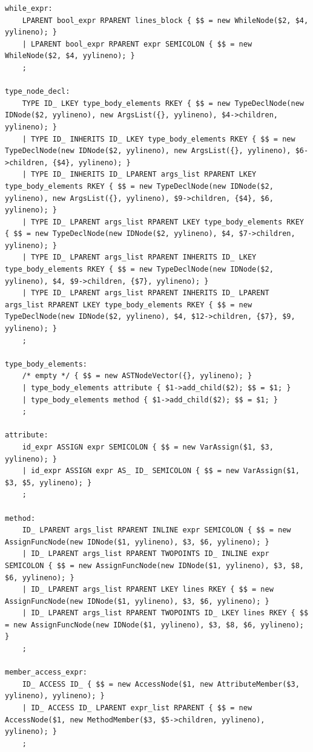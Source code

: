 \documentclass{article}
\begin{document}
\begin{verbatim}
while_expr:
	LPARENT bool_expr RPARENT lines_block { $$ = new WhileNode($2, $4, yylineno); }
	| LPARENT bool_expr RPARENT expr SEMICOLON { $$ = new WhileNode($2, $4, yylineno); }
	;

type_node_decl:
	TYPE ID_ LKEY type_body_elements RKEY { $$ = new TypeDeclNode(new IDNode($2, yylineno), new ArgsList({}, yylineno), $4->children, yylineno); }
	| TYPE ID_ INHERITS ID_ LKEY type_body_elements RKEY { $$ = new TypeDeclNode(new IDNode($2, yylineno), new ArgsList({}, yylineno), $6->children, {$4}, yylineno); }
	| TYPE ID_ INHERITS ID_ LPARENT args_list RPARENT LKEY type_body_elements RKEY { $$ = new TypeDeclNode(new IDNode($2, yylineno), new ArgsList({}, yylineno), $9->children, {$4}, $6, yylineno); }
	| TYPE ID_ LPARENT args_list RPARENT LKEY type_body_elements RKEY { $$ = new TypeDeclNode(new IDNode($2, yylineno), $4, $7->children, yylineno); }
	| TYPE ID_ LPARENT args_list RPARENT INHERITS ID_ LKEY type_body_elements RKEY { $$ = new TypeDeclNode(new IDNode($2, yylineno), $4, $9->children, {$7}, yylineno); }
	| TYPE ID_ LPARENT args_list RPARENT INHERITS ID_ LPARENT args_list RPARENT LKEY type_body_elements RKEY { $$ = new TypeDeclNode(new IDNode($2, yylineno), $4, $12->children, {$7}, $9, yylineno); }
	;

type_body_elements:
	/* empty */ { $$ = new ASTNodeVector({}, yylineno); }
	| type_body_elements attribute { $1->add_child($2); $$ = $1; }
	| type_body_elements method { $1->add_child($2); $$ = $1; }
	;

attribute:
	id_expr ASSIGN expr SEMICOLON { $$ = new VarAssign($1, $3, yylineno); }
	| id_expr ASSIGN expr AS_ ID_ SEMICOLON { $$ = new VarAssign($1, $3, $5, yylineno); }
	;

method:
	ID_ LPARENT args_list RPARENT INLINE expr SEMICOLON { $$ = new AssignFuncNode(new IDNode($1, yylineno), $3, $6, yylineno); }
	| ID_ LPARENT args_list RPARENT TWOPOINTS ID_ INLINE expr SEMICOLON { $$ = new AssignFuncNode(new IDNode($1, yylineno), $3, $8, $6, yylineno); } 
	| ID_ LPARENT args_list RPARENT LKEY lines RKEY { $$ = new AssignFuncNode(new IDNode($1, yylineno), $3, $6, yylineno); }
	| ID_ LPARENT args_list RPARENT TWOPOINTS ID_ LKEY lines RKEY { $$ = new AssignFuncNode(new IDNode($1, yylineno), $3, $8, $6, yylineno); }
	;

member_access_expr:
	ID_ ACCESS ID_ { $$ = new AccessNode($1, new AttributeMember($3, yylineno), yylineno); }
	| ID_ ACCESS ID_ LPARENT expr_list RPARENT { $$ = new AccessNode($1, new MethodMember($3, $5->children, yylineno), yylineno); } 
	;
\end{verbatim}
\end{document}
